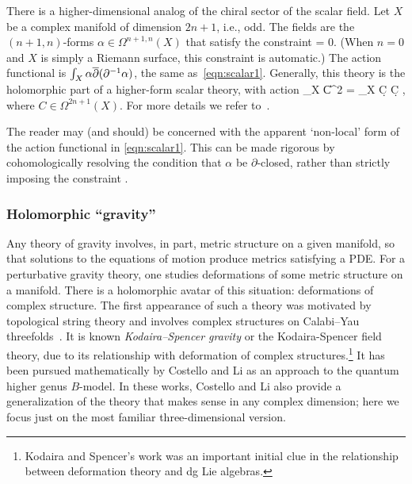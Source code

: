 \documentclass[11pt]{amsart}
\def\del{\partial}
\renewcommand{\op}{\operatorname}
\begin{document}
There is a higher-dimensional analog of the chiral sector of the scalar field.
Let $X$ be a complex manifold of dimension $2n+1$, i.e., odd.
The fields are the $(n+1,n)$-forms $\alpha \in \Omega^{n+1,n}(X)$ that satisfy the constraint
\beqn
\del \alpha = 0.
\eeqn
(When $n=0$ and $X$ is simply a Riemann surface, 
this constraint is automatic.)
The action functional is $\int_X \alpha \dbar(\del^{-1} \alpha)$, the same as~\eqref{eqn:scalar1}.
Generally, this theory is the holomorphic part of a higher-form scalar theory, with action
\beqn
\int_X \|C\|^2 \op{dvol} = \int_X \d C \wedge \star \d C , 
\eeqn
where $C \in \Omega^{2n+1}(X)$.
For more details we refer to~\cite{GRW_WZW}.

The reader may (and should) be concerned with the apparent `non-local' form of the action functional in \eqref{eqn:scalar1}.
This can be made rigorous by cohomologically resolving the condition that $\alpha$ be $\del$-closed, rather than strictly imposing the constraint \cite{CLbcov1}.

\subsubsection{Holomorphic ``gravity''}

Any theory of gravity involves, in part, metric structure on a given manifold,
so that solutions to the equations of motion produce metrics satisfying a PDE. 
For a perturbative gravity theory,
one studies deformations of some metric structure on a manifold.
There is a holomorphic avatar of this situation: deformations of complex structure. 
The first appearance of such a theory was motivated by topological string theory and involves complex structures on Calabi--Yau threefolds~\cite{BCOV}.
It is known \textit{Kodaira--Spencer gravity} or the Kodaira-Spencer field theory,
due to its relationship with deformation of complex structures.\footnote{Kodaira and Spencer's work was an important initial clue in the relationship between deformation theory and dg Lie algebras.}
It has been pursued mathematically by Costello and Li \cite{CLbcov1,CLbcov2,LiThesis} as an approach to the quantum higher genus $B$-model.
In these works, Costello and Li also provide a generalization of the theory that makes sense in any complex dimension; 
here we focus just on the most familiar three-dimensional version.
\end{document}
